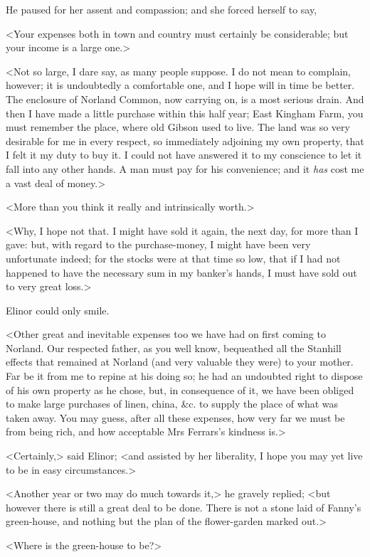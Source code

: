 He paused for her assent and compassion; and she forced herself to say,

<Your expenses both in town and country must certainly be considerable; but your income is a large one.>

<Not so large, I dare say, as many people suppose. I do not mean to complain, however; it is undoubtedly a comfortable one, and I hope will in time be better. The enclosure of Norland Common, now carrying on, is a most serious drain. And then I have made a little purchase within this half year; East Kingham Farm, you must remember the place, where old Gibson used to live. The land was so very desirable for me in every respect, so immediately adjoining my own property, that I felt it my duty to buy it. I could not have answered it to my conscience to let it fall into any other hands. A man must pay for his convenience; and it \textit{has} cost me a vast deal of money.>

<More than you think it really and intrinsically worth.>

<Why, I hope not that. I might have sold it again, the next day, for more than I gave: but, with regard to the purchase-money, I might have been very unfortunate indeed; for the stocks were at that time so low, that if I had not happened to have the necessary sum in my banker's hands, I must have sold out to very great loss.>

Elinor could only smile.

<Other great and inevitable expenses too we have had on first coming to Norland. Our respected father, as you well know, bequeathed all the Stanhill effects that remained at Norland (and very valuable they were) to your mother. Far be it from me to repine at his doing so; he had an undoubted right to dispose of his own property as he chose, but, in consequence of it, we have been obliged to make large purchases of linen, china, \&c. to supply the place of what was taken away. You may guess, after all these expenses, how very far we must be from being rich, and how acceptable Mrs Ferrars's kindness is.>

<Certainly,> said Elinor; <and assisted by her liberality, I hope you may yet live to be in easy circumstances.>

<Another year or two may do much towards it,> he gravely replied; <but however there is still a great deal to be done. There is not a stone laid of Fanny's green-house, and nothing but the plan of the flower-garden marked out.>

<Where is the green-house to be?>

